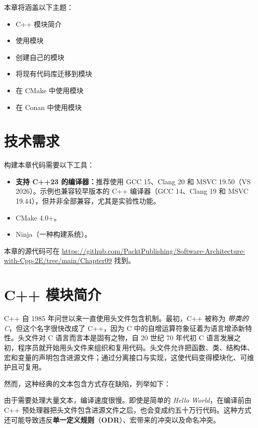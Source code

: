 本章将涵盖以下主题：

\begin{itemize}
\item C++ 模块简介
\item 使用模块
\item 创建自己的模块
\item 将现有代码库迁移到模块
\item 在 CMake 中使用模块
\item 在 Conan 中使用模块
\end{itemize}

\section{技术需求}

构建本章代码需要以下工具：

\begin{itemize}
\item \textbf{支持 C++23 的编译器：}推荐使用 GCC 15、Clang 20 和 MSVC 19.50（VS 2026）。示例也兼容较早版本的 C++ 编译器（GCC 14、Clang 19 和 MSVC 19.44），但并非全部兼容，尤其是实验性功能。
\item CMake 4.0+。
\item Ninja（一种构建系统）。
\end{itemize}

本章的源代码可在 \href{https://github.com/PacktPublishing/Software-Architecture-with-Cpp-2E/tree/main/Chapter09}{https://github.com/PacktPublishing/Software-Architecture-with-Cpp-2E/tree/main/Chapter09} 找到。

\section{C++ 模块简介}

\label{idx:746}
C++ 自 1985 年问世以来一直使用头文件包含机制。最初，C++ 被称为 \emph{带类的 C}，但这个名字很快改成了 C++，因为 C 中的自增运算符象征着为语言增添新特性。头文件对 C 语言而言本是固有之物，自 20 世纪 70 年代初 C 语言发展之初，程序员就开始用头文件来组织和复用代码。头文件允许把函数、类、结构体、宏和变量的声明包含进源文件；通过分离接口与实现，这使代码变得模块化、可维护且可复用。

然而，这种经典的文本包含方式存在缺陷，列举如下：

\label{idx:747}
由于需要处理大量文本，编译速度很慢。即使是简单的 \emph{Hello World}，在编译前由 C++ 预处理器把头文件包含进源文件之后，也会变成约五十万行代码。这种方式还可能导致违反\textbf{单一定义规则}（\textbf{ODR}）、宏带来的冲突以及命名冲突。


